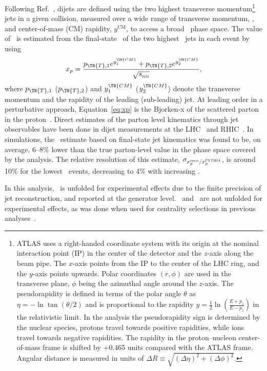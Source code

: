 \documentclass[PAPER, atlasdraft=false, USenglish, cernpreprint]{atlasdoc}
\begin{document}
Following Ref.~\cite{ATLAS:2023zfx},
dijets are defined using the two highest transverse momentum\footnote{ATLAS uses a right-handed coordinate system with its origin at the nominal interaction point (IP)
in the center of the detector and the \(z\)-axis along the beam pipe.
The \(x\)-axis points from the IP to the center of the LHC ring,
and the \(y\)-axis points upwards.
Polar coordinates \((r,\phi)\) are used in the transverse plane, 
\(\phi\) being the azimuthal angle around the \(z\)-axis.
The pseudorapidity is defined in terms of the polar angle \(\theta\) as \(\eta = -\ln \tan(\theta/2)\) and is proportional to the rapidity
$ y = \frac{1}{2} \ln \left( \frac{E + p_z}{E - p_z} \right) $ in the relativistic limit.  In the analysis the pseudorapidity sign is determined by the nuclear species, protons travel towards positive rapidities, while ions travel towards negative rapidities. 
The rapidity in the proton--nucleon center-of-mass frame is shifted by +0.465 units compared with the ATLAS frame.
Angular distance is measured in units of $\Delta R\equiv \sqrt{ (\Delta \eta)^2 + (\Delta \phi)^2 }$. } 
jets in a given collision, measured over a wide range of transverse momentum, \PT, and center-of-mass (CM) rapidity, $y^\mathrm{CM}$, to access a broad \xp\ phase space. The value of \xp\ is estimated from the final-state \kin\ of the two highest \PT\ jets in each event by using 
\begin{equation}
\label{eq:xp}
x_p = 
\frac{ p_{\TN{T},1}e^{y^\TN{CM}_{1}} 
+ 
p_{\TN{T},2}e^{y^\TN{CM}_{2}}}
{\sqrt{s_{_\text{NN}}}},
\end{equation}
where $p_{\TN{T},1}$ ($p_{\TN{T},2}$) and $y^\TN{CM}_{1}$ ($y^\TN{CM}_{2}$) denote the transverse momentum and the rapidity of the leading (sub-leading) jet.
At leading order in a perturbative approach, Equation~\ref{eq:xp} is the Bjorken-x of the scattered parton in the proton~\cite{PhysRevLett.123.102001}.  Direct estimates of the parton level kinematics through jet observables have been done in dijet measurements at the LHC~\cite{HION-2015-02} and RHIC~\cite{PhysRevLett.107.172301}.
In simulations, the \xp\ estimate based on final-state jet kinematics was found to be, on average, 6--8\% lower than the true parton-level value in the phase space covered by the analysis. The relative resolution of this estimate, $\sigma_{x_p^{\mathrm{reco}}/x_p^{\textsc{PYTHIA}}}$, is around 10\% for the lowest \xp\ events, decreasing to 4\% with increasing \xp.



In this analysis, \xp\ is unfolded for experimental effects due to the finite precision of jet reconstruction, and reported at the generator level. 
\EZDC\ and \ETPB\ are not unfolded for experimental effects, as was done when used for centrality selections in previous analyses~\cite{ATLAS:2014cpa, ATLAS:2023zfx, ATLAS:2022iyq}.  
\end{document}
